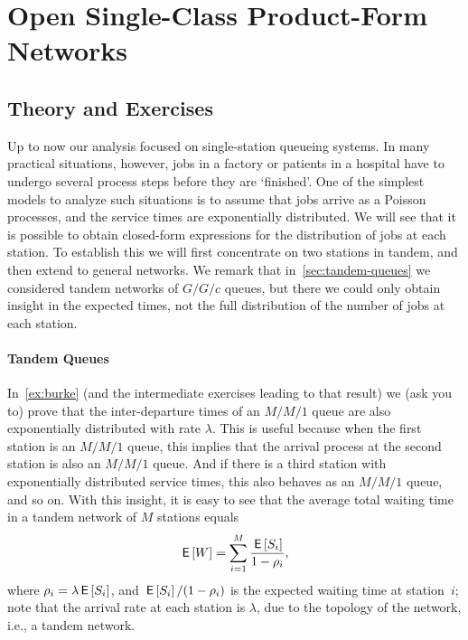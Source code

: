 \section{Open Single-Class Product-Form Networks}
\label{sec:jackson-networks}


\subsection*{Theory and Exercises}



Up to now our analysis focused on single-station queueing systems.
In many practical situations, however, jobs in a factory or patients in a hospital have to undergo several process steps before they are `finished'.
One of the simplest models to analyze such situations is to assume that jobs arrive as a Poisson processes, and the service times are exponentially distributed.
We will see that it is possible to obtain closed-form expressions for the distribution of jobs at each station.
To establish this we will first concentrate on two stations in tandem, and then extend to general networks.
We remark that in~\cref{sec:tandem-queues} we considered tandem networks of $G/G/c$ queues, but there we could only obtain insight in the expected times, not the full distribution of the number of jobs at each station.

\paragraph{Tandem Queues}

In~\cref{ex:burke} (and the intermediate exercises leading to that result) we (ask you to) prove that the inter-departure times of an $M/M/1$ queue are also exponentially distributed with rate $\lambda$.
This is useful because when the first station is an $M/M/1$ queue, this implies that the arrival process at the second station is also an $M/M/1$ queue.
And if there is a third station with exponentially distributed service times, this also behaves as an $M/M/1$ queue, and so on.
With this insight, it is easy to see that the average total waiting time in a tandem network of $M$ stations equals
\begin{equation*}
  \,\mathsf{E}\left[W\right] = \sum_{i=1}^M \frac{\,\mathsf{E}\left[S_i\right]}{1-\rho_i},
\end{equation*}
where $\rho_i = \lambda \,\mathsf{E}\left[S_i\right]$, and $\,\mathsf{E}\left[S_i\right]/(1-\rho_i)$ is the expected waiting time at station~$i$; note that the arrival rate at each station is $\lambda$, due to the topology of the network, i.e., a tandem network.




